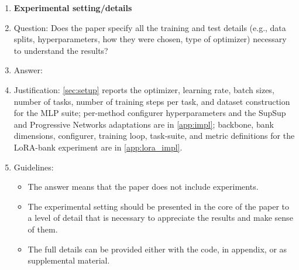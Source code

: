 \begin{enumerate}
\item {\bf Experimental setting/details}
    \item[] Question: Does the paper specify all the training and test details (e.g., data splits, hyperparameters, how they were chosen, type of optimizer) necessary to understand the results?
    \item[] Answer: \answerYes{}
    \item[] Justification: \cref{sec:setup} reports the optimizer, learning rate, batch sizes, number of tasks, number of training steps per task, and dataset construction for the MLP suite; per-method configurer hyperparameters and the SupSup and Progressive Networks adaptations are in \cref{app:impl}; backbone, bank dimensions, configurer, training loop, task-suite, and metric definitions for the LoRA-bank experiment are in \cref{app:lora_impl}.
    \item[] Guidelines:
    \begin{itemize}
        \item The answer \answerNA{} means that the paper does not include experiments.
        \item The experimental setting should be presented in the core of the paper to a level of detail that is necessary to appreciate the results and make sense of them.
        \item The full details can be provided either with the code, in appendix, or as supplemental material.
    \end{itemize}


\end{enumerate}

